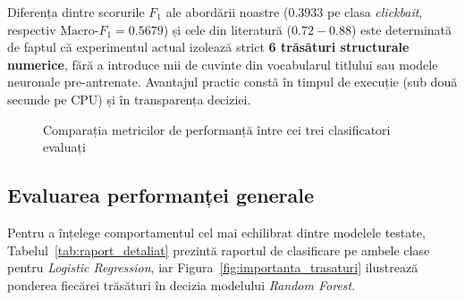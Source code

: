 \documentclass[12pt, a4paper]{article}
\begin{document}
Diferența dintre scorurile $F_1$ ale abordării noastre ($0.3933$ pe clasa \textit{clickbait}, respectiv $\text{Macro-}F_1 = 0.5679$) și cele din literatură ($0.72 - 0.88$) este determinată de faptul că experimentul actual izolează strict \textbf{6 trăsături structurale numerice}, fără a introduce mii de cuvinte din vocabularul titlului sau modele neuronale pre-antrenate. Avantajul practic constă în timpul de execuție (sub două secunde pe CPU) și în transparența deciziei.

\begin{figure}[htbp]
\centering
{}
\caption{Comparația metricilor de performanță între cei trei clasificatori evaluați}
\label{fig:comparatie_modele}
\end{figure}

\subsection{Evaluarea performanței generale}

Pentru a înțelege comportamentul cel mai echilibrat dintre modelele testate, Tabelul~\ref{tab:raport_detaliat} prezintă raportul de clasificare pe ambele clase pentru \textit{Logistic Regression}, iar Figura~\ref{fig:importanta_trasaturi} ilustrează ponderea fiecărei trăsături în decizia modelului \textit{Random Forest}.
\end{document}
